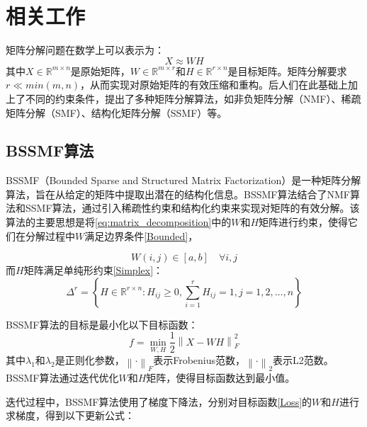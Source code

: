 \documentclass[12pt]{article}
\begin{document}
\newpage

\section{相关工作}

矩阵分解问题在数学上可以表示为：
\begin{equation}
    X \approx WH
    \label{eq:matrix_decomposition}
\end{equation}
其中$X\in \mathbb{R}^{m \times n}$是原始矩阵，$W \in \mathbb{R}^{m \times r}$和$H \in \mathbb{R}^{r \times n}$是目标矩阵。矩阵分解要求$r\ll min(m, n)$\cite{NMFIdentifiability}，从而实现对原始矩阵的有效压缩和重构。后人们在此基础上加上了不同的约束条件，提出了多种矩阵分解算法，如非负矩阵分解（NMF）\cite{NMF}、稀疏矩阵分解（SMF）\cite{SMF}、结构化矩阵分解（SSMF）\cite{SSMF2}\cite{SSMF1}等。

\subsection{BSSMF算法}
BSSMF（Bounded Sparse and Structured Matrix Factorization）\cite{BSSMF}是一种矩阵分解算法，旨在从给定的矩阵中提取出潜在的结构化信息。BSSMF算法结合了NMF算法和SSMF算法，通过引入稀疏性约束和结构化约束来实现对矩阵的有效分解。该算法的主要思想是将\eqref{eq:matrix_decomposition}中的$W$和$H$矩阵进行约束，使得它们在分解过程中$W$满足边界条件\eqref{Bounded}，

\begin{equation}
    W(i,j) \in [a, b] \quad \forall i,j
    \label{Bounded}
\end{equation}
而$H$矩阵满足单纯形约束\eqref{Simplex}：
\begin{equation}
    \Delta^r = \left\{ H \in \mathbb{R}^{r \times n} : H_{ij} \geq 0, \sum_{i=1}^{r} H_{ij} = 1, j=1,2,\ldots,n \right\}
    \label{Simplex}
\end{equation}

BSSMF算法的目标是最小化以下目标函数：
\begin{equation}
    f = \min_{W,H} \frac{1}{2}\left\lVert X - WH \right\rVert_F^2 
    \label{Loss}
\end{equation}
其中$\lambda_1$和$\lambda_2$是正则化参数，$\left\lVert \cdot \right\rVert_F$表示Frobenius范数，$\left\lVert \cdot \right\rVert_2$表示L2范数。BSSMF算法通过迭代优化$W$和$H$矩阵，使得目标函数达到最小值。

迭代过程中，BSSMF算法使用了梯度下降法，分别对目标函数\eqref{Loss}的$W$和$H$进行求梯度，得到以下更新公式：
\end{document}
